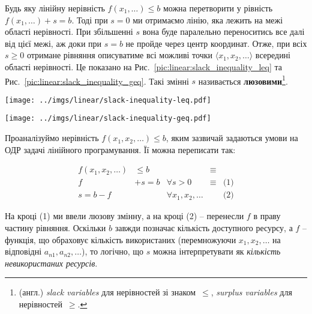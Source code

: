 \documentclass[\main/book.tex]{subfiles}
\begin{document}
Будь яку лінійну нерівність $f(x_1, \ldots) \leq b$ можна перетворити у рівність $f(x_1, \ldots) + s = b$. Тоді при ${s=0}$ ми отримаємо лінію, яка лежить на межі області нерівності. При збільшенні $s$ вона буде паралельно переноситись все далі від цієї межі, аж доки при $s=b$ не пройде через центр координат. Отже, при всіх $s \geq 0$ отримане рівняння описуватиме всі можливі точки $\langle x_1, x_2, \ldots \rangle$ всередині області нерівності. Це показано на Рис.~\ref{pic:linear:slack_inequality_leq} та Рис.~\ref{pic:linear:slack_inequality_geq}. Такі змінні $s$ називається \textbf{люзовими}\footnote{(англ.) \textit{slack variables} для нерівностей зі знаком~\flqq{}$\leq$\frqq{}, \textit{surplus variables} для нерівностей~\flqq{}$\geq$\frqq{}.}.

\begin{figure*}
 \centering
 \begin{minipage}[t]{.47\textwidth}
  \texttt{[image: ../imgs/linear/slack-inequality-leq.pdf]}
  \caption{Нерівність $x_1 + x_2 \leq 4$ утворює область, межу якої можна описати рівнянням $x_1 + x_2 + s = 4$ при $s=0$. При $s=b=4$ ця лі\-нія проходить через центр координат.}
  \label{pic:linear:slack_inequality_leq}
 \end{minipage}\qquad
 \begin{minipage}[t]{.47\textwidth}
  \texttt{[image: ../imgs/linear/slack-inequality-geq.pdf]}
  \caption{Для того, щоби отримати такий самий ефект для нерівностей \flqq{}$\geq$\frqq{}, змінну $s$ потрібно включити у рівняння прямої зі знаком~\flqq{}$-$\frqq{}.}
  \label{pic:linear:slack_inequality_geq}
 \end{minipage}
\end{figure*}

Проаналізуймо нерівність $f(x_1, x_2, \ldots) \leq b$, яким зазвичай задаються умови на ОДР задачі лінійного програмування. Її можна переписати так:
 
\[
 \begin{array}{lrlll}
  f(x_1, x_2, \ldots) &  \leq b &                         & \equiv &            \\
  f                   & + s = b & \forall s > 0           & \equiv & \text{(1)} \\
  s = b - f           &         & \forall x_1, x_2, \ldots &        & \text{(2)}
 \end{array}
\]

На кроці (1) ми ввели люзову змінну, а на кроці (2) -- перенесли $f$ в праву частину рівняння. Оскільки $b$ завжди позначає кількість доступного ресурсу, а $f$ -- функція, що обраховує кількість використаних (перемножуючи $x_1, x_2, \ldots$ на відповідні $a_{n1}, a_{n2}, \ldots$), то логічно, що $s$ можна інтерпретувати як \textit{кількість невикористаних ресурсів}.
\end{document}

